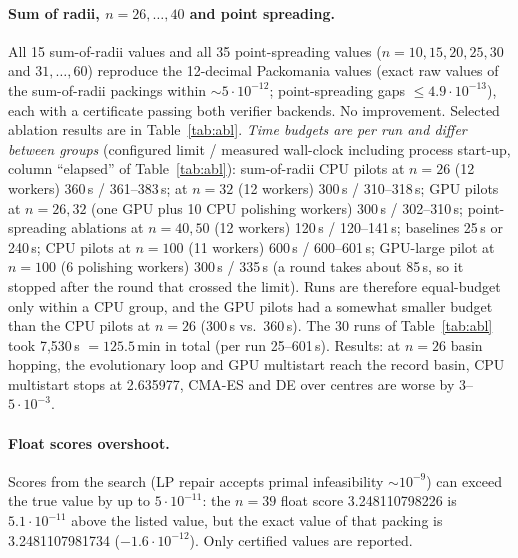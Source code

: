 \documentclass[10pt]{article}
\begin{document}
\paragraph{Sum of radii, $n=26,\dots,40$ and point spreading.} All 15 sum-of-radii values and all 35 point-spreading values ($n=10,15,20,25,30$ and $31,\dots,60$) reproduce the 12-decimal Packomania values (exact raw values of the sum-of-radii packings within $\sim5\cdot10^{-12}$; point-spreading gaps $\le4.9\cdot10^{-13}$), each with a certificate passing both verifier backends. No improvement. Selected ablation results are in Table~\ref{tab:abl}. \emph{Time budgets are per run and differ between groups} (configured limit / measured wall-clock including process start-up, column ``elapsed'' of Table~\ref{tab:abl}): sum-of-radii CPU pilots at $n=26$ (12 workers) 360\,s / 361--383\,s; at $n=32$ (12 workers) 300\,s / 310--318\,s; GPU pilots at $n=26,32$ (one GPU plus 10 CPU polishing workers) 300\,s / 302--310\,s; point-spreading ablations at $n=40,50$ (12 workers) 120\,s / 120--141\,s; baselines 25\,s or 240\,s; CPU pilots at $n=100$ (11 workers) 600\,s / 600--601\,s; GPU-large pilot at $n=100$ (6 polishing workers) 300\,s / 335\,s (a round takes about 85\,s, so it stopped after the round that crossed the limit). Runs are therefore equal-budget only within a CPU group, and the GPU pilots had a somewhat smaller budget than the CPU pilots at $n=26$ (300\,s vs.\ 360\,s). The 30 runs of Table~\ref{tab:abl} took 7{,}530\,s $=125.5$\,min in total (per run 25--601\,s). Results: at $n=26$ basin hopping, the evolutionary loop and GPU multistart reach the record basin, CPU multistart stops at 2.635977, CMA-ES and DE over centres are worse by $3$--$5\cdot10^{-3}$.
\begin{table}[h]\centering
\begin{center}\resizebox{.95\linewidth}{!}{}\end{center}
\caption{Pilot, baseline and ablation runs (A = sum of radii, B = point spreading; ms = multistart, bh = basin hopping, gpu = GPU stage; gaps versus the table of 2026-09-28/29; ``elapsed'' = measured wall-clock per run in seconds, including process start-up; time\_to\_best in seconds; the 30 runs total 7{,}530\,s $=125.5$\,min).}\label{tab:abl}
\end{table}
\paragraph{Float scores overshoot.} Scores from the search (LP repair accepts primal infeasibility $\sim10^{-9}$) can exceed the true value by up to $5\cdot10^{-11}$: the $n=39$ float score 3.248110798226 is $5.1\cdot10^{-11}$ above the listed value, but the exact value of that packing is 3.2481107981734 ($-1.6\cdot10^{-12}$). Only certified values are reported.
\end{document}
